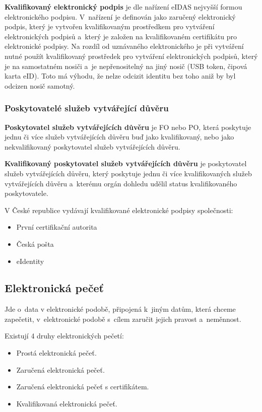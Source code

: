 \textbf{Kvalifikovaný elektronický podpis} je dle nařízení eIDAS nejvyšší formou elektronického podpisu. V~nařízení je definován jako zaručený elektronický podpis, který je vytvořen kvalifikovaným prostředkem pro vytváření elektronických podpisů a~který je založen na kvalifikovaném certifikátu pro elektronické podpisy. Na rozdíl od uznávaného elektronického je při vytváření nutné použít kvalifikovaný prostředek pro vytváření elektronických podpisů, který je na samostatném nosiči a~je nepřenositelný na jiný nosič (USB token, čipová karta eID). Toto má výhodu, že nelze odcizit identitu bez toho aniž by byl odcizen nosič samotný.

\vspace{-0,4cm}
\subsubsection{Poskytovatelé služeb vytvářející důvěru}
\vspace{-0,4cm}

\textbf{Poskytovatel služeb vytvářejících důvěru} je FO nebo PO, která poskytuje jednu či více služeb vytvářejících důvěru buď jako kvalifikovaný, nebo jako nekvalifikovaný poskytovatel služeb vytvářejících důvěru.

\textbf{Kvalifikovaný poskytovatel služeb vytvářejících důvěru} je poskytovatel služeb vytvářejících důvěru, který poskytuje jednu či více kvalifikovaných služeb vytvářejících důvěru a~kterému orgán dohledu udělil status kvalifikovaného poskytovatele.

V České republice vydávají kvalifikované elektronické podpisy společnosti:
\begin{itemize}[noitemsep]
    \item První certifikační autorita
    \item Česká pošta
    \item eIdentity
\end{itemize}

\vspace{-0,4cm}
\subsection{Elektronická pečeť}
\vspace{-0,4cm}

Jde o~data v elektronické podobě, připojená k~jiným datům, která chceme zapečetit, v~elektronické podobě s~cílem zaručit jejich pravost a~neměnnost.

Existují 4 druhy elektronických pečetí:
\begin{itemize}[noitemsep]
    \item Prostá elektronická pečeť.
    \item Zaručená elektronická pečeť.
    \item Zaručená elektronická pečeť s certifikátem.
    \item Kvalifikovaná elektronická pečeť.
\end{itemize}

